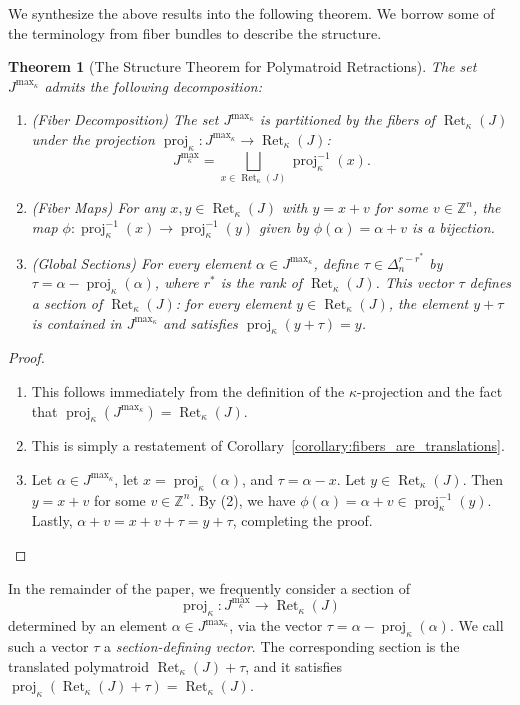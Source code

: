 \documentclass[10pt,a4paper]{amsart}
\newtheorem{theorem}{Theorem}[section]
\DeclareMathOperator{\proj}{proj}              %
\newcommand{\kproj}{\proj_{\kappa}}            %
\DeclareMathOperator{\Ret}{Ret}                %
\newcommand{\RetK}{\Ret_{\kappa}}              %
\newcommand{\Jmax}{J^{\max_{\kappa}}}
\begin{document}
We synthesize the above results into the following theorem. We borrow some of the terminology from fiber bundles to describe the structure. 

\begin{theorem}[The Structure Theorem for Polymatroid Retractions] \label{theorem:structure_theorem_for_mconvex}
    The set $\Jmax$ admits the following decomposition:

    \begin{enumerate}
        \item [\textup{(1)}] (Fiber Decomposition) The set $\Jmax$ is partitioned by the fibers of $\RetK(J)$ under the projection $\kproj \colon \Jmax \rightarrow \RetK(J)$:
        \[
        \Jmax = \bigsqcup_{x\in \RetK(J)} \kproj^{-1}(x).
        \]

        \item [\textup{(2)}](Fiber Maps) For any $x,y \in \RetK(J)$ with $y = x + v$ for some $v \in \mathbb{Z}^n$, the map $\phi\colon \kproj^{-1}(x) \to \kproj^{-1}(y)$ given by $\phi(\alpha) = \alpha + v$ is a bijection.

        \item [\textup{(3)}](Global Sections) For every element $\alpha \in \Jmax$, define $\tau \in \Delta_n^{r-r^*}$ by $\tau = \alpha - \kproj(\alpha)$, where $r^*$ is the rank of $\RetK(J)$. This vector $\tau$ defines a section of $\RetK(J)$: for every element $y \in \RetK(J)$, the element $y + \tau$ is contained in $\Jmax$ and satisfies $\kproj(y+\tau) = y$. 
    \end{enumerate}
\end{theorem}
\begin{proof}
\leavevmode
\begin{enumerate}
    \item [\textup{(1)}]This follows immediately from the definition of the $\kappa$-projection and the fact that $\kproj(\Jmax) = \RetK(J)$.
    \item [\textup{(2)}]This is simply a restatement of Corollary~\ref{corollary:fibers_are_translations}.
    \item [\textup{(3)}]Let $\alpha \in \Jmax$, let $x = \kproj(\alpha)$, and $\tau = \alpha - x$. Let $y \in \RetK(J)$. Then $y = x + v$ for some $v \in \mathbb{Z}^n$. By (2), we have $\phi(\alpha) = \alpha + v \in \kproj^{-1}(y)$. Lastly, $\alpha + v = x + v + \tau = y+ \tau$, completing the proof.
\end{enumerate} 
\end{proof}
In the remainder of the paper, we frequently consider a section of
\[
    \kproj\colon\Jmax\to\RetK(J)
\]
determined by an element $\alpha\in\Jmax$, via the vector $\tau=\alpha-\kproj(\alpha)$. We call such a vector $\tau$ a \emph{section-defining vector}. The corresponding section is the translated polymatroid $\RetK(J)+\tau$, and it satisfies $\kproj(\RetK(J)+\tau)=\RetK(J)$.
\end{document}
